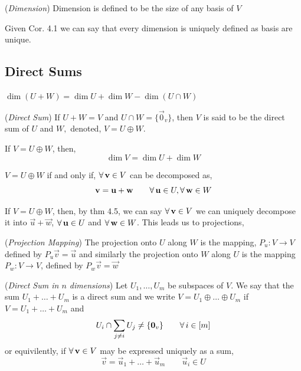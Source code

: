 \documentclass{article}
\begin{document}
\begin{ndefi}{(\textit{Dimension})}
  Dimension is defined to be the size of any basis of $V$
\end{ndefi}

\begin{remark}
  Given Cor. 4.1 we can say that every dimension is uniquely defined as basis are unique.
\end{remark}

\subsection{Direct Sums}
\begin{nthm}
  $ \dim (U + W) = \dim U + \dim W - \dim (U \cap W)$
\end{nthm}

\begin{defi}{(\textit{Direct Sum})}
  If $U + W = V$ and $U \cap W = \{\vec 0_v\}$, then $V$ is said to be the direct sum of $U$ and $W,$ denoted, $V = U \oplus W$.
\end{defi}

\begin{ncor}
  If $V = U \oplus W$, then,
  $$ \dim V = \dim U + \dim W $$
\end{ncor}

\begin{nthm}
  $V = U \oplus W$ if and only if, $\forall\, \boldsymbol{\mathbf{v}} \in V$ can be decomposed as,
  $$ \boldsymbol{\mathbf{v}} = \boldsymbol{\mathbf{u}} + \boldsymbol{\mathbf{w}} \qquad \forall\, \boldsymbol{\mathbf{u}} \in U, \forall\, \boldsymbol{\mathbf{w}} \in W $$
\end{nthm}

\noindent
If $V = U \oplus W$, then, by thm 4.5, we can say $\forall\,\boldsymbol{\mathbf{v}} \in V$ we can uniquely decompose it into $\vec u + \vec w$, $\forall\, \boldsymbol{\mathbf{u}} \in U$ and $\forall\, \boldsymbol{\mathbf{w}} \in W$. This leads us to projections,

\begin{ndefi}{(\textit{Projection Mapping})}
  The projection onto $U$ along $W$ is the mapping, $P_u : V \to V$ defined by $P_u \vec v = \vec u$ and similarly the projection onto $W$ along $U$ is the mapping $P_w: V \to V$, defined by $P_w \vec v =\vec  w$
\end{ndefi}

\begin{ndefi}{(\textit{Direct Sum in $n$ dimensions})}
  Let $U_1, \dots, U_m$ be subspaces of $V$. We say that the sum $U_1 + \dots + U_m$ is a direct sum and we write $V = U_1 \oplus \dots \oplus U_m$ if $V = U_1 + \dots + U_m$ and
  $$ U_i \cap \sum_{j \neq i} U_j \ne \{ \boldsymbol{\mathbf{0}}_v \} \qquad\forall\, i \in [m]$$
  or equivilently, if $\forall\, \boldsymbol{\mathbf{v}} \in V$ may be expressed uniquely as a sum,
  $$ \vec v = \vec u_1 + \dots + \vec u_m \qquad \vec u_i \in U$$
\end{ndefi}
\end{document}
